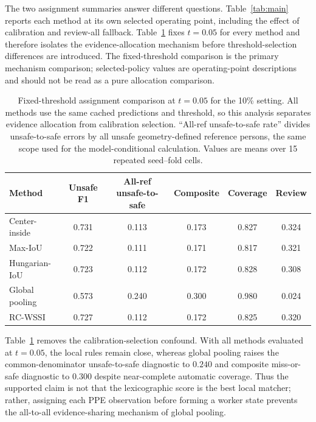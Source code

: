 \documentclass[iicol,pdflatex,sn-mathphys-num]{sn-jnl}
\begin{document}
The two assignment summaries answer different questions. Table~\ref{tab:main} reports each method at its own selected operating point, including the effect of calibration and review-all fallback. Table~\ref{tab:fixed_assignment} fixes $t=0.05$ for every method and therefore isolates the evidence-allocation mechanism before threshold-selection differences are introduced. The fixed-threshold comparison is the primary mechanism comparison; selected-policy values are operating-point descriptions and should not be read as a pure allocation comparison.

\begin{table}[t]
\caption{Fixed-threshold assignment comparison at $t=0.05$ for the 10\% setting. All methods use the same cached predictions and threshold, so this analysis separates evidence allocation from calibration selection. ``All-ref unsafe-to-safe rate'' divides unsafe-to-safe errors by all unsafe geometry-defined reference persons, the same scope used for the model-conditional calculation. Values are means over 15 repeated seed--fold cells.}
\label{tab:fixed_assignment}
\centering
\small
\begin{tabular}{@{}lccccc@{}}
\toprule
Method & Unsafe F1 & All-ref unsafe-to-safe & Composite & Coverage & Review \\
\midrule
Center-inside & 0.731 & 0.113 & 0.173 & 0.827 & 0.324 \\
Max-IoU & 0.722 & 0.111 & 0.171 & 0.817 & 0.321 \\
Hungarian-IoU & 0.723 & 0.112 & 0.172 & 0.828 & 0.308 \\
Global pooling & 0.573 & 0.240 & 0.300 & 0.980 & 0.024 \\
RC-WSSI & 0.727 & 0.112 & 0.172 & 0.825 & 0.320 \\
\bottomrule
\end{tabular}
\end{table}

Table~\ref{tab:fixed_assignment} removes the calibration-selection confound. With all methods evaluated at $t=0.05$, the local rules remain close, whereas global pooling raises the common-denominator unsafe-to-safe diagnostic to $0.240$ and composite miss-or-safe diagnostic to $0.300$ despite near-complete automatic coverage. Thus the supported claim is not that the lexicographic score is the best local matcher; rather, assigning each PPE observation before forming a worker state prevents the all-to-all evidence-sharing mechanism of global pooling.
\end{document}
